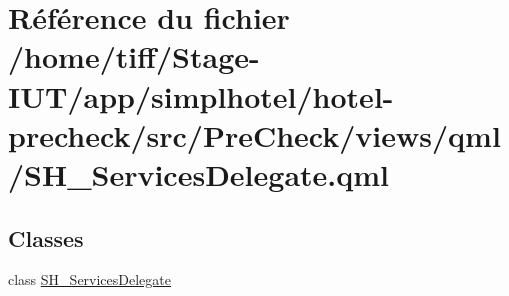 \hypertarget{SH__ServicesDelegate_8qml}{\section{Référence du fichier /home/tiff/\-Stage-\/\-I\-U\-T/app/simplhotel/hotel-\/precheck/src/\-Pre\-Check/views/qml/\-S\-H\-\_\-\-Services\-Delegate.qml}
\label{SH__ServicesDelegate_8qml}
}
\subsection*{Classes}
\begin{DoxyCompactItemize}
\item 
class \hyperlink{classSH__ServicesDelegate}{S\-H\-\_\-\-Services\-Delegate}
\end{DoxyCompactItemize}
